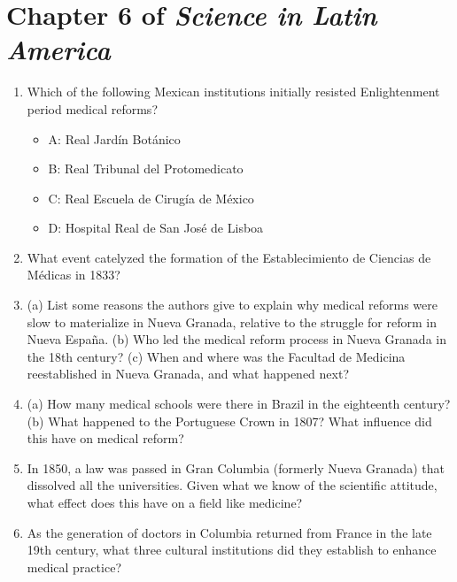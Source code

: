 \documentclass[12pt]{article}
\begin{document}
\maketitle
\small

\section{Chapter 6 of \textit{Science in Latin America}}

\begin{enumerate}
\item Which of the following Mexican institutions initially resisted Enlightenment period medical reforms?
\begin{itemize}
\item A: Real Jard\'{i}n Bot\'{a}nico
\item B: Real Tribunal del Protomedicato
\item C: Real Escuela de Cirug\'{i}a de M\'{e}xico
\item D: Hospital Real de San Jos\'{e} de Lisboa
\end{itemize}
\item What event catelyzed the formation of the Establecimiento de Ciencias de M\'{e}dicas in 1833? \\ \vspace{0.5cm}
\item (a) List some reasons the authors give to explain why medical reforms were slow to materialize in Nueva Granada, relative to the struggle for reform in Nueva Espa\~{n}a. (b) Who led the medical reform process in Nueva Granada in the 18th century? (c) When and where was the Facultad de Medicina reestablished in Nueva Granada, and what happened next? \\ \vspace{1.5cm}
\item (a) How many medical schools were there in Brazil in the eighteenth century? (b) What happened to the Portuguese Crown in 1807? What influence did this have on medical reform? \\ \vspace{1cm}
\item In 1850, a law was passed in Gran Columbia (formerly Nueva Granada) that dissolved all the universities.  Given what we know of the scientific attitude, what effect does this have on a field like medicine? \\ \vspace{1cm}
\item As the generation of doctors in Columbia returned from France in the late 19th century, what three cultural institutions did they establish to enhance medical practice?
\end{enumerate}
\end{document}
